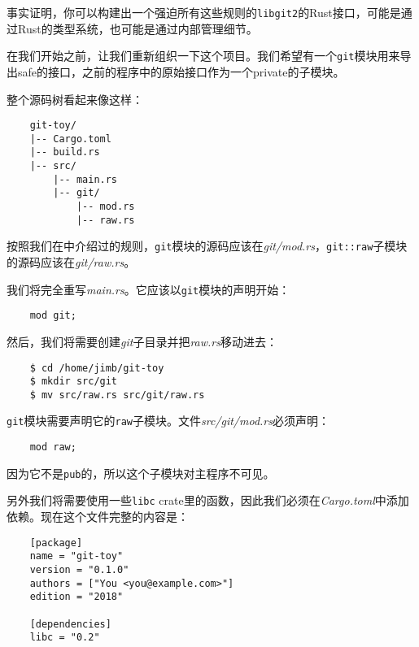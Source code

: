 事实证明，你可以构建出一个强迫所有这些规则的\texttt{libgit2}的Rust接口，可能是通过Rust的类型系统，也可能是通过内部管理细节。

在我们开始之前，让我们重新组织一下这个项目。我们希望有一个\texttt{git}模块用来导出safe的接口，之前的程序中的原始接口作为一个private的子模块。

整个源码树看起来像这样：
\begin{verbatim}
    git-toy/
    |-- Cargo.toml
    |-- build.rs
    |-- src/
        |-- main.rs
        |-- git/
            |-- mod.rs
            |-- raw.rs
\end{verbatim}

按照我们在中介绍过的规则，\texttt{git}模块的源码应该在\emph{git/mod.rs}，\texttt{git::raw}子模块的源码应该在\emph{git/raw.rs}。

我们将完全重写\emph{main.rs}。它应该以\texttt{git}模块的声明开始：
\begin{verbatim}
    mod git;
\end{verbatim}

然后，我们将需要创建\emph{git}子目录并把\emph{raw.rs}移动进去：
\begin{verbatim}
    $ cd /home/jimb/git-toy
    $ mkdir src/git
    $ mv src/raw.rs src/git/raw.rs
\end{verbatim}

\texttt{git}模块需要声明它的\texttt{raw}子模块。文件\emph{src/git/mod.rs}必须声明：
\begin{verbatim}
    mod raw;
\end{verbatim}

因为它不是\texttt{pub}的，所以这个子模块对主程序不可见。

另外我们将需要使用一些\texttt{libc} crate里的函数，因此我们必须在\emph{Cargo.toml}中添加依赖。现在这个文件完整的内容是：
\begin{verbatim}
    [package]
    name = "git-toy"
    version = "0.1.0"
    authors = ["You <you@example.com>"]
    edition = "2018"

    [dependencies]
    libc = "0.2"
\end{verbatim}

